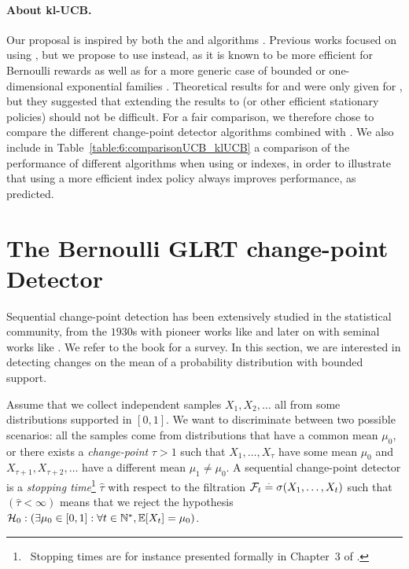 \paragraph{About kl-UCB.}
%
Our proposal \GLRklUCB{} is inspired by both the \MUCB{} and \CUSUMUCB{} algorithms \cite{LiuLeeShroff17,CaoZhenKvetonXie18}.
Previous works focused on using \UCB,
but we propose to use \klUCB{} instead, as it is known to be more efficient for Bernoulli rewards as well as for a more generic case of bounded or one-dimensional exponential families \cite{KLUCBJournal}.
Theoretical results for \cite{LiuLeeShroff17} and \cite{CaoZhenKvetonXie18} were only given for \UCB, but they suggested that extending the results to \klUCB{} (or other efficient stationary policies) should not be difficult.
For a fair comparison, we therefore chose to compare the different change-point detector algorithms combined with \klUCB.
We also include in Table~\ref{table:6:comparisonUCB_klUCB} a comparison of the performance of different algorithms when using \UCB{} or \klUCB{} indexes, in order to illustrate that using a more efficient index policy always improves performance, as predicted.


\section{The Bernoulli GLRT change-point Detector}
\label{sec:6:ChangePointDetector}

Sequential change-point detection has been extensively studied in the statistical community, from the $1930$s with pioneer works like \cite{Wilks1938} and later on with seminal works like \cite{barnard1959control,siegmund1995using}.
We refer to the book \cite{Basseville93} for a survey.
%
In this section, we are interested in detecting changes on the mean of a probability distribution with bounded support.

Assume that we collect independent samples $X_1,X_2,\dots$ all from some distributions supported in $[0,1]$.
We want to discriminate between two possible scenarios: all the samples come from distributions that have a common mean $\mu_0$, or there exists a \emph{change-point} $\tau > 1$ such that $X_1,\dots,X_\tau$ have some mean $\mu_0$ and $X_{\tau +1},X_{\tau+2},\dots$ have a different mean $\mu_1 \neq \mu_0$.
%
A sequential change-point detector is a \emph{stopping time}\footnote{~Stopping times are for instance presented formally in Chapter~3 of \cite{LattimoreBanditAlgorithmsBook}.} $\widehat{\tau}$ with respect to the filtration $\mathcal{F}_t \overset{.}{=} \sigma(X_1,\dots,X_t)$ such that $(\hat \tau < \infty)$ means that we reject the hypothesis
$\mathcal{H}_0 : \left(\exists \mu_0 \in [0,1]: \forall t\in\mathbb{N}^*, \mathbb{E}[X_t] = \mu_0\right)$.

